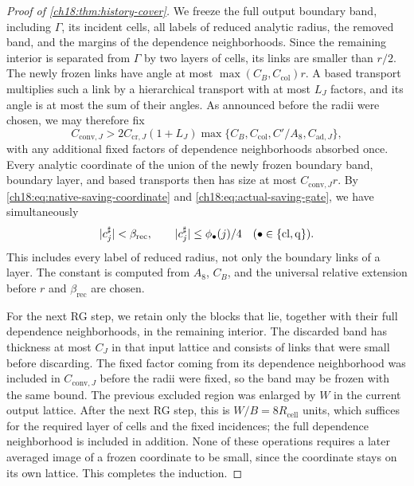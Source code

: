\begin{proof}[Proof of \cref{ch18:thm:history-cover}]
We freeze the full output boundary band, including $\Gamma$, its incident cells, all labels of reduced analytic radius, the removed band, and the margins of the dependence neighborhoods. Since the remaining interior is separated from $\Gamma$ by two layers of cells, its links are smaller than $r/2$. The newly frozen links have angle at most $\max(C_B,C_{\mathrm{col}})r$. A based transport multiplies such a link by a hierarchical transport with at most $L_J$ factors, and its angle is at most the sum of their angles. As announced before the radii were chosen, we may therefore fix
\begin{equation}\label{ch18:eq:saving-constant}
 C_{\mathrm{conv},J}
   >2C_{\mathrm{cr},J}(1+L_J)
       \max\{C_B,C_{\mathrm{col}},C'/A_8,C_{\mathrm{ad},J}\},
\end{equation}
with any additional fixed factors of dependence neighborhoods absorbed once. Every analytic coordinate of the union of the newly frozen boundary band, boundary layer, and based transports then has size at most $C_{\mathrm{conv},J}r$. By \eqref{ch18:eq:native-saving-coordinate} and \eqref{ch18:eq:actual-saving-gate}, we have simultaneously
\begin{equation}\label{ch18:eq:all-saved-values}
 \lvert c_j^\sharp\rvert<\beta_{\mathrm{rec}},\qquad
 \lvert c_j^\sharp\rvert\le\phi_\bullet(j)/4
          \quad(\bullet\in\{\mathrm{cl},\mathrm q\}).
\end{equation}
This includes every label of reduced radius, not only the boundary links of a layer. The constant is computed from $A_8$, $C_B$, and the universal relative extension before $r$ and $\beta_{\mathrm{rec}}$ are chosen.

For the next RG step, we retain only the blocks that lie, together with their full dependence neighborhoods, in the remaining interior. The discarded band has thickness at most $C_J$ in that input lattice and consists of links that were small before discarding. The fixed factor coming from its dependence neighborhood was included in $C_{\mathrm{conv},J}$ before the radii were fixed, so the band may be frozen with the same bound. The previous excluded region was enlarged by $W$ in the current output lattice. After the next RG step, this is $W/B=8R_{\mathrm{cell}}$ units, which suffices for the required layer of cells and the fixed incidences; the full dependence neighborhood is included in addition. None of these operations requires a later averaged image of a frozen coordinate to be small, since the coordinate stays on its own lattice. This completes the induction.


\end{proof}
